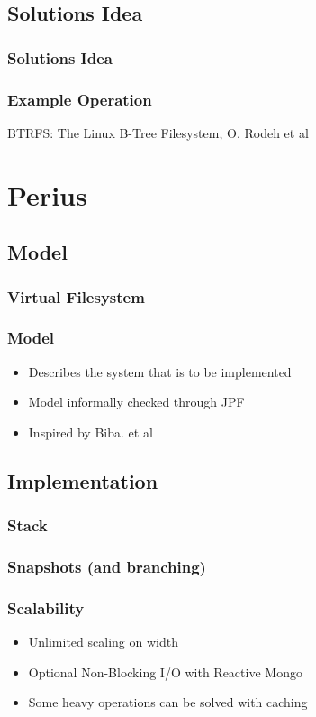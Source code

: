\documentclass{beamer}
\begin{document}
\subsection{Solutions Idea}
\begin{frame}
  \frametitle{Solutions Idea}
  \centerline{}
\end{frame}
\begin{frame}
  \frametitle{Example Operation}
  \centerline{}
  \vspace{20pt}
  \centerline{\tiny{BTRFS: The Linux B-Tree Filesystem, O. Rodeh et al}}
\end{frame}

\section{Perius}
\subsection{Model}
\begin{frame}
  \frametitle{Virtual Filesystem}
  \centerline{}
\end{frame}

\begin{frame}
  \frametitle{Model}
  \begin{itemize}
    \item{Describes the system that is to be implemented}
    \pause
    \item{Model informally checked through JPF}
    \pause
    \item{Inspired by Biba. et al}
  \end{itemize}
\end{frame}

\subsection{Implementation}
\begin{frame}
  \frametitle{Stack}
  \centerline{}
\end{frame}

\begin{frame}
  \frametitle{Snapshots (and branching)}
  \centerline{}
\end{frame}

\begin{frame}
  \frametitle{Scalability}
  \begin{itemize}
    \item{Unlimited scaling on width}
    \pause
    \item{Optional Non-Blocking I/O with Reactive Mongo}
    \pause
    \item{Some heavy operations can be solved with caching} %
  \end{itemize}
\end{frame}
\end{document}
